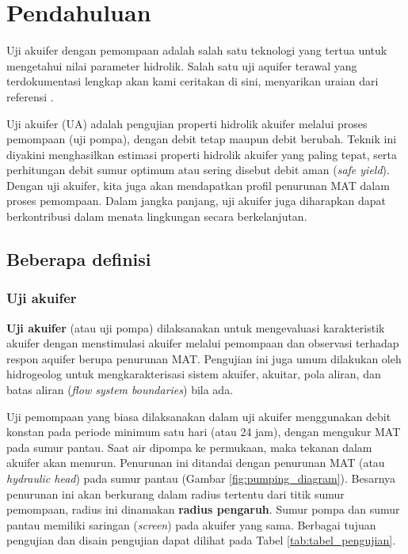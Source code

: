 \section{Pendahuluan}

Uji akuifer dengan pemompaan adalah salah satu teknologi yang tertua untuk mengetahui nilai parameter hidrolik. Salah satu uji aquifer terawal yang terdokumentasi lengkap akan kami ceritakan di sini, menyarikan uraian dari referensi \cite{kruseman1994analysis}.

Uji akuifer (UA) adalah pengujian properti hidrolik akuifer melalui proses pemompaan (uji pompa), dengan debit tetap maupun debit berubah. Teknik ini diyakini menghasilkan estimasi properti hidrolik akuifer yang paling tepat, serta perhitungan debit sumur optimum atau sering disebut debit aman (\textit{safe yield}). Dengan uji akuifer, kita juga akan mendapatkan profil penurunan MAT dalam proses pemompaan. Dalam jangka panjang, uji akuifer juga diharapkan dapat berkontribusi dalam menata lingkungan secara berkelanjutan. 

\subsection{Beberapa definisi}

\subsubsection{Uji akuifer}

\textbf{Uji akuifer} (atau uji pompa) dilaksanakan untuk mengevaluasi karakteristik akuifer dengan menstimulasi akuifer melalui pemompaan dan observasi terhadap respon aquifer berupa penurunan MAT. Pengujian ini juga umum dilakukan oleh hidrogeolog untuk mengkarakterisasi sistem akuifer, akuitar, pola aliran, dan batas aliran (\textit{flow system boundaries}) bila ada. 

Uji pemompaan yang biasa dilaksanakan dalam uji akuifer menggunakan debit konstan pada periode minimum satu hari (atau 24 jam), dengan mengukur MAT pada sumur pantau. Saat air dipompa ke permukaan, maka tekanan dalam akuifer akan menurun. Penurunan ini ditandai dengan penurunan MAT (atau \textit{hydraulic head}) pada sumur pantau (Gambar \ref{fig:pumping_diagram}). Besarnya penurunan ini akan berkurang dalam radius tertentu dari titik sumur pemompaan, radius ini dinamakan \textbf{radius pengaruh}. Sumur pompa dan sumur pantau memiliki saringan (\textit{screen}) pada akuifer yang sama. Berbagai tujuan pengujian dan disain pengujian dapat dilihat pada Tabel \ref{tab:tabel_pengujian}.

